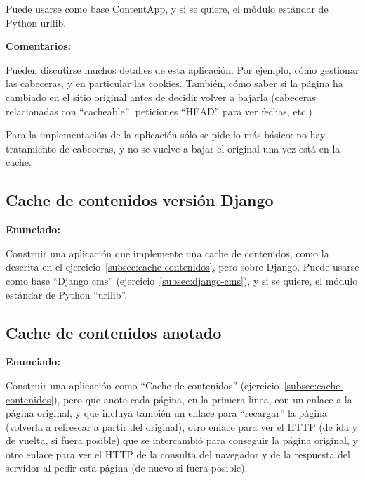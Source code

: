 Puede usarse como base ContentApp, y si se quiere, el módulo estándar de Python urllib.

\textbf{Comentarios:}

Pueden discutirse muchos detalles de esta aplicación. Por ejemplo, cómo gestionar las cabeceras, y en particular las cookies. También, cómo saber si la página ha cambiado en el sitio original antes de decidir volver a bajarla (cabeceras relacionadas con ``cacheable'', peticiones ``HEAD'' para ver fechas, etc.)

Para la implementación de la aplicación sólo se pide lo más básico: no hay tratamiento de cabeceras, y no se vuelve a bajar el original una vez está en la cache.

\subsection{Cache de contenidos versión Django}
\label{subsec:cache-contenidos-django}

\textbf{Enunciado:}

Construir una aplicación que implemente una cache de contenidos, como la descrita en el ejercicio~\ref{subsec:cache-contenidos}, pero sobre Django.
Puede usarse como base ``Django cms'' (ejercicio~\ref{subsec:django-cms}), y si se quiere, el módulo estándar de Python ``urllib''.

\subsection{Cache de contenidos anotado}
\label{subsec:cache-contenidos-anotado}

\textbf{Enunciado:}

Construir una aplicación como ``Cache de contenidos'' (ejercicio~\ref{subsec:cache-contenidos}), pero que anote cada página, en la primera línea, con un enlace a la página original, y que incluya también un enlace para ``recargar'' la página (volverla a refrescar a partir del original), otro enlace para ver el HTTP (de ida y de vuelta, si fuera posible) que se intercambió para conseguir la página original, y otro enlace para ver el HTTP de la consulta del navegador y de la respuesta del servidor al pedir esta página (de nuevo si fuera posible).

